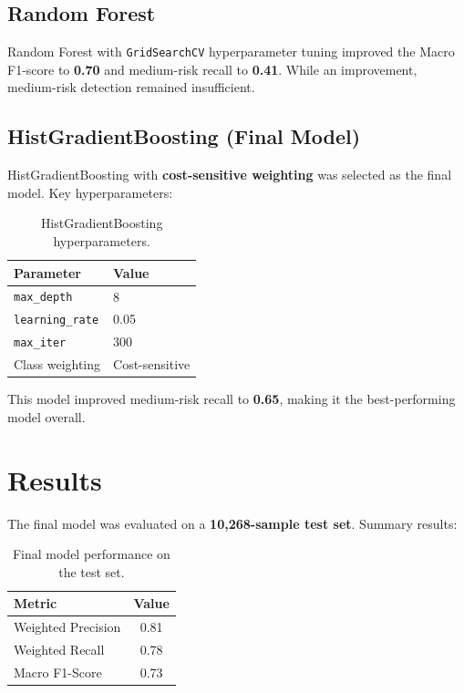 \documentclass[12pt,a4paper]{article}
\begin{document}
\subsection{Random Forest}

Random Forest with \texttt{GridSearchCV} hyperparameter tuning improved the Macro F1-score to \textbf{0.70} and medium-risk recall to \textbf{0.41}. While an improvement, medium-risk detection remained insufficient.

\subsection{HistGradientBoosting (Final Model)}

HistGradientBoosting with \textbf{cost-sensitive weighting} was selected as the final model. Key hyperparameters:

\begin{table}[h!]
    \centering
    \begin{tabular}{@{} l l @{}}
        \toprule
        \textbf{Parameter} & \textbf{Value} \\
        \midrule
        \texttt{max\_depth}     & 8     \\
        \texttt{learning\_rate} & 0.05  \\
        \texttt{max\_iter}      & 300   \\
        Class weighting        & Cost-sensitive \\
        \bottomrule
    \end{tabular}
    \caption{HistGradientBoosting hyperparameters.}
    \label{tab:hyperparams}
\end{table}

\noindent This model improved medium-risk recall to \textbf{0.65}, making it the best-performing model overall.

\section{Results}

The final model was evaluated on a \textbf{10,268-sample test set}. Summary results:

\begin{table}[h!]
    \centering
    \begin{tabular}{@{} l c @{}}
        \toprule
        \textbf{Metric} & \textbf{Value} \\
        \midrule
        Weighted Precision & 0.81 \\
        Weighted Recall    & 0.78 \\
        Macro F1-Score     & 0.73 \\
        \bottomrule
    \end{tabular}
    \caption{Final model performance on the test set.}
    \label{tab:results}
\end{table}
\end{document}
